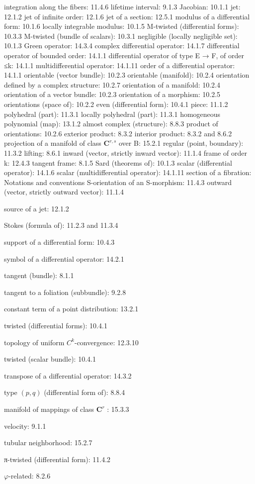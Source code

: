 integration along the fibers: 11.4.6 lifetime interval: 9.1.3 Jacobian: 10.1.1 jet: 12.1.2 jet of infinite order: 12.1.6 jet of a section: 12.5.1 modulus of a differential form: 10.1.6 locally integrable modulus: 10.1.5 M-twisted (differential forms): 10.3.3 M-twisted (bundle of scalars): 10.3.1 negligible (locally negligible set): 10.1.3 Green operator: 14.3.4 complex differential operator: 14.1.7 differential operator of bounded order: 14.1.1 differential operator of type E → F, of order ≤k: 14.1.1 multidifferential operator: 14.1.11 order of a differential operator: 14.1.1 orientable (vector bundle): 10.2.3 orientable (manifold): 10.2.4 orientation defined by a complex structure: 10.2.7 orientation of a manifold: 10.2.4 orientation of a vector bundle: 10.2.3 orientation of a morphism: 10.2.5 orientations (space of): 10.2.2 even (differential form): 10.4.1 piece: 11.1.2 polyhedral (part): 11.3.1 locally polyhedral (part): 11.3.1 homogeneous polynomial (map): 13.1.2 almost complex (structure): 8.8.3 product of orientations: 10.2.6 exterior product: 8.3.2 interior product: 8.3.2 and 8.6.2 projection of a manifold of class \(\mathbf{C}^{r,s}\) over B: 15.2.1 regular (point, boundary): 11.3.2 lifting: 8.6.1 inward (vector, strictly inward vector): 11.1.4 frame of order k: 12.4.3 tangent frame: 8.1.5 Sard (theorems of): 10.1.3 scalar (differential operator): 14.1.6 scalar (multidifferential operator): 14.1.11 section of a fibration: Notations and conventions S-orientation of an S-morphism: 11.4.3 outward (vector, strictly outward vector): 11.1.4

source of a jet: 12.1.2

Stokes (formula of): 11.2.3 and 11.3.4

support of a differential form: 10.4.3

symbol of a differential operator: 14.2.1

tangent (bundle): 8.1.1

tangent to a foliation (subbundle): 9.2.8

constant term of a point distribution: 13.2.1

twisted (differential forms): 10.4.1

topology of uniform \(C^{k}\)-convergence: 12.3.10

twisted (scalar bundle): 10.4.1

transpose of a differential operator: 14.3.2

type \((p,q)\) (differential form of): 8.8.4

manifold of mappings of class \(\mathbf{C}^r\) : 15.3.3

velocity: 9.1.1

tubular neighborhood: 15.2.7

π-twisted (differential form): 11.4.2

\(\varphi\)-related: 8.2.6


